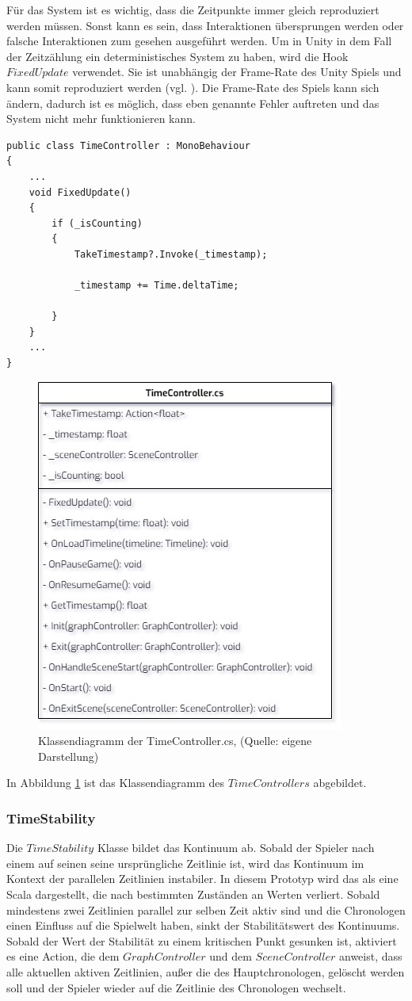 Für das System ist es wichtig, dass die Zeitpunkte immer gleich reproduziert werden müssen. Sonst kann es sein, dass Interaktionen übersprungen werden oder falsche Interaktionen zum gesehen ausgeführt werden. Um in Unity in dem Fall der Zeitzählung ein deterministisches System zu haben, wird die Hook $FixedUpdate$ verwendet. Sie ist unabhängig der Frame-Rate des Unity Spiels und kann somit reproduziert werden (vgl. \cite{technologies_unity_fu}). Die Frame-Rate des Spiels kann sich ändern, dadurch ist es möglich, dass eben genannte Fehler auftreten und das System nicht mehr funktionieren kann.
\begin{lstlisting}[caption={TimeController.ts dieses Prototyps}, label={sec:time-controller}]
public class TimeController : MonoBehaviour
{
    ...
    void FixedUpdate()
    {
        if (_isCounting)
        {
            TakeTimestamp?.Invoke(_timestamp);

            _timestamp += Time.deltaTime;

        }
    }
    ...
}
\end{lstlisting}


\begin{figure}[ht]
\centering
\includegraphics[width=0.4\linewidth]{content/pictures/TimeController.jpg}
\caption{Klassendiagramm der TimeController.cs, (Quelle: eigene Darstellung)}
\label{fig:timeController-cs}
\end{figure}

In Abbildung \ref{fig:timeController-cs} ist das Klassendiagramm des $TimeControllers$ abgebildet.

\subsubsection{TimeStability}
Die $TimeStability$ Klasse bildet das Kontinuum ab. Sobald der Spieler nach einem  auf seinen seine ursprüngliche Zeitlinie  ist, wird das Kontinuum im Kontext der parallelen Zeitlinien instabiler. In diesem Prototyp wird das als eine Scala dargestellt, die nach bestimmten Zuständen an Werten verliert. Sobald mindestens zwei Zeitlinien parallel zur selben Zeit aktiv sind und die Chronologen einen Einfluss auf die Spielwelt haben, sinkt der Stabilitätswert des Kontinuums. Sobald der Wert der Stabilität zu einem kritischen Punkt gesunken ist, aktiviert es eine Action, die dem $GraphController$ und dem $SceneController$ anweist, dass alle aktuellen aktiven Zeitlinien, außer die des Hauptchronologen, gelöscht werden soll und der Spieler wieder auf die Zeitlinie des Chronologen wechselt.
